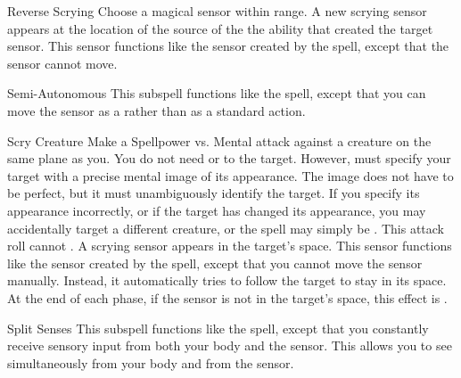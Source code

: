 \begin{ability}[\nth{4}]{Reverse Scrying}
Choose a magical sensor within \rngmed range.
A new scrying sensor appears at the location of the source of the the ability that created the target sensor.
This sensor functions like the sensor created by the  spell, except that the sensor cannot move.
\end{ability}
\vspace{0.25em}


\begin{ability}[\nth{4}]{Semi-Autonomous}
This subspell functions like the  spell, except that you can move the sensor as a  rather than as a standard action.
\end{ability}
\vspace{0.25em}


\begin{ability}[\nth{5}]{Scry Creature}
Make a Spellpower vs. Mental attack against a creature on the same plane as you.
You do not need  or  to the target.
However,  must specify your target with a precise mental image of its appearance.
The image does not have to be perfect, but it must unambiguously identify the target.
If you specify its appearance incorrectly, or if the target has changed its appearance, you may accidentally target a different creature, or the spell may simply be .
This attack roll cannot .
\hit A scrying sensor appears in the target's space.
This sensor functions like the sensor created by the  spell, except that you cannot move the sensor manually.
Instead, it automatically tries to follow the target to stay in its space.
At the end of each phase, if the sensor is not in the target's space, this effect is .
\end{ability}
\vspace{0.25em}


\begin{ability}[\nth{6}]{Split Senses}
This subspell functions like the  spell, except that you constantly receive sensory input from both your body and the sensor.
This allows you to see simultaneously from your body and from the sensor.
\end{ability}
\vspace{0.25em}

